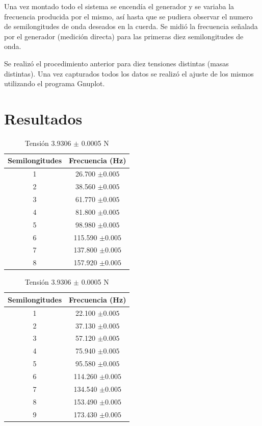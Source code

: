\documentclass[10pt,a4paper]{article}
\begin{document}
Una vez montado todo el sistema se encendía el generador y se variaba la frecuencia producida por el mismo, así hasta que se pudiera observar el numero de semilongitudes de onda deseados en la cuerda. Se midió la frecuencia señalada por el generador (medición directa) para las primeras diez semilongitudes de onda. 

Se realizó el procedimiento anterior para diez tensiones distintas (masas distintas). Una vez capturados todos los datos se realizó el ajuste de los mismos utilizando el programa Gnuplot. 






\newpage
\section{Resultados}

\begin{table}[H]
    \centering
\begin{minipage}[t]{0.48\linewidth}\centering
\caption{Tensión 4.1839 $\pm$ 0.0005 N}
\begin{tabular}{ c c }
\toprule
Semilongitudes &Frecuencia (Hz)      \\
\midrule
1 & 26.700 $\pm0.005$      \\
2& 38.560 $\pm0.005$     \\
3&61.770 $\pm0.005$     \\
4&81.800 $\pm0.005$     \\
5&98.980 $\pm0.005$     \\
6&115.590 $\pm0.005$     \\
7&137.800 $\pm0.005$     \\
8&157.920 $\pm0.005$     \\
\bottomrule
\end{tabular}
\end{minipage}\hfill%
\begin{minipage}[t]{0.48\linewidth}\centering
\caption{Tensión 3.9306 $\pm$ 0.0005 N}
\label{tab:The parameters 2 }
\begin{tabular}{ c c }
\toprule
Semilongitudes &Frecuencia (Hz)      \\
\midrule

1 & 22.100 $\pm0.005$      \\
2& 37.130 $\pm0.005$     \\
3& 57.120 $\pm0.005$     \\
4& 75.940 $\pm0.005$     \\
5&95.580 $\pm0.005$     \\
6&114.260 $\pm0.005$     \\
7&134.540 $\pm0.005$     \\
8&153.490 $\pm0.005$     \\
9 & 173.430 $\pm0.005$ \\
\bottomrule
\end{tabular}
\end{minipage}
\end{table}
\end{document}
